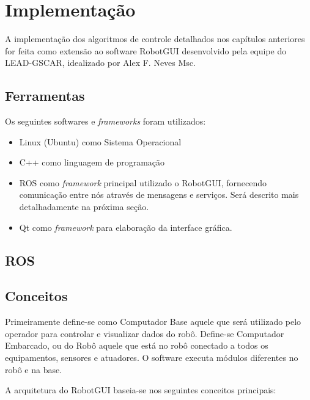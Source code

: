 \chapter{Implementação}
A implementação dos algoritmos de controle detalhados nos capítulos anteriores for feita como extensão ao software RobotGUI desenvolvido pela equipe do LEAD-GSCAR, idealizado por Alex F. Neves Msc. 


\section{Ferramentas}
Os seguintes softwares e \textit{frameworks} foram utilizados:

\begin{itemize}
\item Linux (Ubuntu) como Sistema Operacional
\item C++ como linguagem de programação
\item ROS como \textit{framework} principal utilizado o RobotGUI, fornecendo comunicação entre nós através de mensagens e serviços. Será descrito mais detalhadamente na próxima seção.
\item Qt como \textit{framework} para elaboração da interface gráfica. 
\end{itemize}

\section{ROS}

\section{Conceitos}

Primeiramente define-se como Computador Base aquele que será utilizado pelo operador para controlar e visualizar dados do robô. Define-se Computador Embarcado, ou do Robô aquele que está no robô conectado a todos os equipamentos, sensores e atuadores. O software executa módulos diferentes no robô e na base.

A arquitetura do RobotGUI baseia-se nos seguintes conceitos principais:

